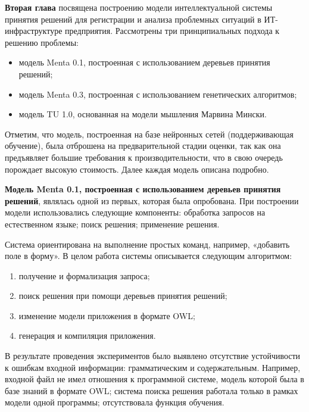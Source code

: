 
\textbf{Вторая глава} посвящена построению модели интеллектуальной системы принятия решений для регистрации и анализа проблемных ситуаций в ИТ-инфраструктуре предприятия. Рассмотрены три принципиальных подхода к решению проблемы:
 \begin{itemize}
	\item модель Menta 0.1, построенная с использованием деревьев принятия решений;
	\item модель Menta 0.3, построенная с использованием генетических алгоритмов;
	\item модель TU 1.0, основанная на модели мышления Марвина Мински.
\end{itemize} \par

Отметим, что модель, построенная на базе нейронных сетей (поддерживающая обучение), была отброшена на предварительной стадии оценки, так как она предъявляет большие требования к производительности, что в свою очередь порождает высокую стоимость. Далее каждая модель описана подробно.

\textbf{Модель Menta 0.1, построенная с использованием деревьев принятия решений}, являлась одной из первых, которая была опробована. При построении модели использовались следующие компоненты: обработка запросов на естественном языке; поиск решения; применение решения. \par
Система ориентирована на выполнение простых команд, например, «добавить поле в форму». В целом работа системы описывается следующим алгоритмом:
\begin{enumerate}
	\item получение и формализация запроса;
	\item поиск решения при помощи деревьев принятия решений;
	\item изменение модели приложения в формате OWL;
	\item генерация и компиляция приложения.
\end{enumerate} \par
В результате проведения экспериментов было выявлено отсутствие устойчивости к ошибкам входной информации: грамматическим и содержательным. Например, входной файл не имел отношения к программной системе, модель которой была в базе знаний в формате OWL; система поиска решения работала только в рамках модели одной программы;  отсутствовала функция обучения. \par



